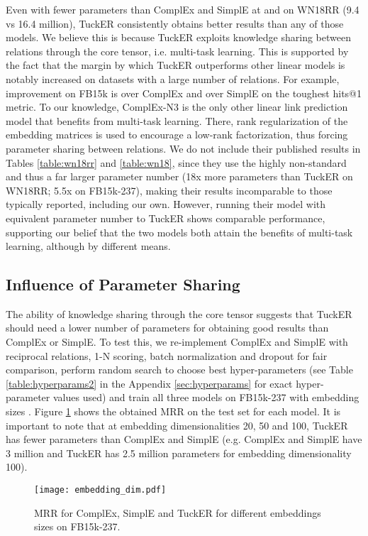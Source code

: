 \documentclass[11pt,a4paper]{article}
\begin{document}
Even with fewer parameters than ComplEx and SimplE at  and  on WN18RR (9.4 vs 16.4 million), TuckER consistently obtains better results than any of those models. We believe this is because TuckER exploits knowledge sharing between relations through the core tensor, i.e. multi-task learning. This is supported by the fact that the margin by which TuckER outperforms other linear models is notably increased on datasets with a large number of relations. For example, improvement on FB15k is  over ComplEx and  over SimplE on the toughest hits@1 metric. To our knowledge, ComplEx-N3 \cite{lacroix2018canonical} is the only other linear link prediction model that benefits from multi-task learning. There, rank regularization of the embedding matrices is used to encourage a low-rank factorization, thus forcing parameter sharing between relations. We do not include their published results in Tables \ref{table:wn18rr} and \ref{table:wn18}, since they use 
the highly non-standard  and thus a far larger parameter number (18x more parameters than TuckER on WN18RR; 5.5x on FB15k-237), making their results incomparable to those typically reported, including our own. However, running their model with equivalent parameter number to TuckER shows comparable performance, supporting our belief that the two models both attain the benefits of multi-task learning, although by different means.

\subsection{Influence of Parameter Sharing} \label{sec:bound}

The ability of knowledge sharing through the core tensor suggests that TuckER should need a lower number of parameters for obtaining good results than ComplEx or SimplE. To test this, we re-implement ComplEx and SimplE with reciprocal relations, 1-N scoring, batch normalization and dropout for fair comparison, perform random search to choose best hyper-parameters (see Table \ref{table:hyperparams2} in the Appendix \ref{sec:hyperparams} for exact hyper-parameter values used) and train all three models on FB15k-237 with embedding sizes . Figure \ref{fig:results} shows the obtained MRR on the test set for each model. It is important to note that at embedding dimensionalities 20, 50 and 100, TuckER has fewer parameters than ComplEx and SimplE (e.g. ComplEx and SimplE have 3 million and TuckER has 2.5 million parameters for embedding dimensionality 100).

\begin{figure}[!htb]
\centering
\texttt{[image: embedding\_dim.pdf]}
\caption{MRR for ComplEx, SimplE and TuckER for different embeddings sizes on FB15k-237.}
\label{fig:results}
\end{figure}
\end{document}
